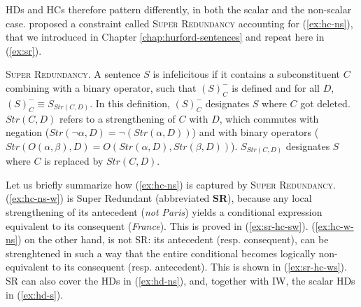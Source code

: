 	
	
	HDs and HCs therefore pattern differently, in both the scalar and the non-scalar case. \citet{Kalomoiros2024} proposed a constraint called \textsc{Super Redundancy} accounting for (\ref{ex:hc-ns}), that we introduced in Chapter \ref{chap:hurford-sentences} and repeat here in (\ref{ex:sr}).
	
	\begin{exe}
		\ex \textsc{Super Redundancy}. A sentence $S$ is infelicitous if it contains a subconstituent $C$ combining with a binary operator, such that $(S)^-_C$ is defined and for all $D$, $(S)^-_C \equiv S_{Str(C, D)}$. In this definition, $(S)^-_C$ designates $S$ where $C$ got deleted. $Str(C, D)$ refers to a strengthening of $C$ with $D$, which commutes with negation ($Str(\neg\alpha, D) = \neg (Str(\alpha, D))$) and with binary operators ($Str(O(\alpha, \beta), D) = O(Str(\alpha, D), Str(\beta, D))$). $S_{Str(C, D)}$ designates $S$ where $C$ is replaced by $Str(C, D)$.\label{ex:sr}
	\end{exe}
	
	Let us briefly summarize how (\ref{ex:hc-ns}) is captured by \textsc{Super Redundancy}. (\ref{ex:hc-ns-w}) is Super Redundant (abbreviated \textbf{SR}), because any local strengthening of its antecedent (\textit{not Paris}) yields a conditional expression equivalent to its consequent (\textit{France}). This is proved in (\ref{ex:sr-hc-sw}). (\ref{ex:hc-w-ns}) on the other hand, is not SR: its antecedent (resp. consequent), can be strenghtened in such a way that the entire conditional becomes logically non-equivalent to its consequent (resp. antecedent). This is shown in (\ref{ex:sr-hc-ws}). SR can also cover the HDs in (\ref{ex:hd-ns}), and, together with IW, the scalar HDs in (\ref{ex:hd-s}).
	
	\begin{exe}
		\ex
		\begin{xlist}
			 \label{ex:sr-hc-sw}
			 \label{ex:sr-hc-ws}
		\end{xlist} 
		
	\end{exe}
	
